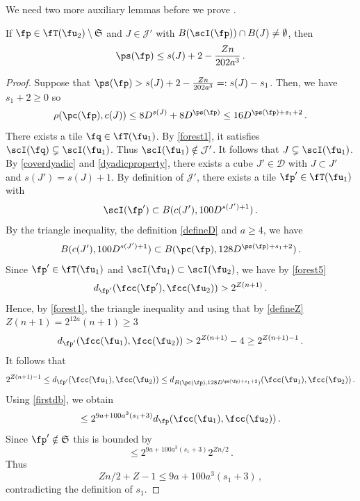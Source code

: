     We need two more auxiliary lemmas before we prove .

    \begin{lemma}
        \label{thin-scale-impact}
        \leanok
        If $\fp \in \fT(\fu_2) \setminus \mathfrak{S}$ and $J \in \mathcal{J'}$ with $B(\scI(\fp)) \cap B(J) \ne \emptyset$, then
        $$
            \ps(\fp) \le s(J) + 2 - \frac{Zn}{202a^3}\,.
        $$
    \end{lemma}

    \begin{proof}
        \leanok
        Suppose that $\ps(\fp) > s(J) + 2 -\frac{Zn}{202a^3} =: s(J) - s_1$. Then, we have $s_1 + 2 \ge 0$ so
        $$
            \rho(\pc(\fp), c(J)) \le 8D^{s(J)}+8D^{\ps(\fp)} \le 16 D^{\ps(\fp) + s_1 + 2}\,.
        $$
        There exists a tile $\fq \in \fT(\fu_1)$. By \eqref{forest1}, it satisfies $\scI(\fq) \subsetneq \scI(\fu_1)$. Thus $\scI(\fu_1) \notin \mathcal{J}'$. It follows that $J \subsetneq \scI(\fu_1)$. By \eqref{coverdyadic} and \eqref{dyadicproperty}, there exists a cube $J' \in \mathcal{D}$ with $J \subset J'$ and $s(J') = s(J) + 1$. By definition of $\mathcal{J}'$, there exists a tile $\fp' \in \fT(\fu_1)$ with
        $$
            \scI(\fp') \subset B(c(J'), 100 D^{s(J') + 1})\,.
        $$
        By the triangle inequality, the definition \eqref{defineD} and $a \ge 4$, we have
        $$
            B(c(J'), 100 D^{s(J')+1}) \subset B(\pc(\fp), 128 D^{\ps(\fp) + s_1 + 2})\,.
        $$
        Since $\fp' \in \fT(\fu_1)$ and $\scI(\fu_1) \subset \scI(\fu_2)$, we have by \eqref{forest5}
        $$
            d_{\fp'}(\fcc(\fp'), \fcc(\fu_2)) > 2^{Z(n+1)}\,.
        $$
        Hence, by \eqref{forest1}, the triangle inequality and using that by \eqref{defineZ} $Z(n+1) = 2^{12a}(n+1) \ge 3$
        $$
            d_{\fp'}(\fcc(\fu_1), \fcc(\fu_2)) > 2^{Z(n+1)} - 4 \ge 2^{Z(n+1) - 1}\,.
        $$
        It follows that
        $$
            2^{Z(n+1)-1} \le d_{\fp'}(\fcc(\fu_1), \fcc(\fu_2)) \le d_{B(\pc(\fp), 128 D^{\ps(\fp) + s_1+ 2})}(\fcc(\fu_1), \fcc(\fu_2))\,.
        $$
        Using \eqref{firstdb}, we obtain
        $$
            \le 2^{9a + 100a^3 (s_1+3)} d_{\fp}(\fcc(\fu_1), \fcc(\fu_2))\,.
        $$
        Since $\fp' \notin \mathfrak{S}$ this is bounded by
        $$
            \le 2^{9a + 100a^3 (s_1+3)} 2^{Zn/2}\,.
        $$
        Thus
        $$
            Z n/2 + Z - 1 \le 9a + 100a^3(s_1 + 3)\,,
        $$
        contradicting the definition of $s_1$.
    \end{proof}

